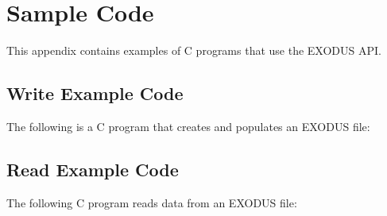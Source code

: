 \chapter{Sample Code}
This appendix contains examples of C programs that use the EXODUS
API.

\section{Write Example Code}

The following is a C program that creates and populates an EXODUS
file:

\newpage
\section{Read Example Code}

The following C program reads data from an EXODUS file:


